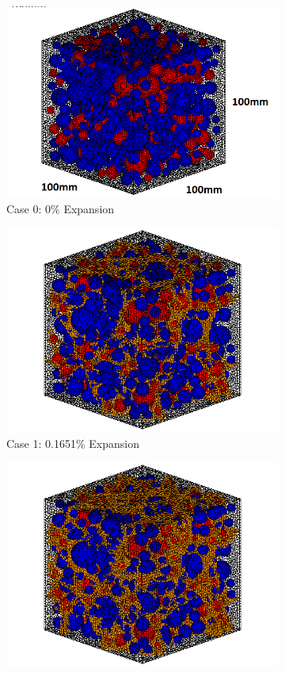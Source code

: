 \begin{figure}[!h]
\centering

    \begin{subfigure}{.5\textwidth}
      \centering
      \includegraphics[width=.8\linewidth]{Files/Aggregate/A30P25.png} %
    \caption{Case 0: 0\% Expansion}
    \end{subfigure}%
    \begin{subfigure}{.5\textwidth}
      \centering
      \includegraphics[width=.8\linewidth]{Files/exp_3D/ASR/A30P25_1_c.png}
    \caption{Case 1: 0.1651\% Expansion}
    \end{subfigure}
    \begin{subfigure}{.5\textwidth}
      \centering
      \includegraphics[width=.8\linewidth]{Files/exp_3D/ASR/A30P25_2_c.png}

\end{subfigure}
\end{figure}

